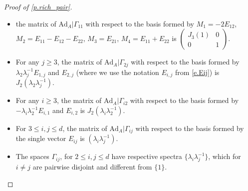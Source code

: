 \documentclass[10pt, a4paper]{amsart}
\theoremstyle{plain}
\theoremstyle{definition}
\theoremstyle{remark}
\theoremstyle{note}
\numberwithin{equation}{section}
\begin{document}
\begin{proof}[Proof of \cref{p.rich_pair}]
\begin{itemize}
\item the matrix of ${{\mathrm{Ad}}_A}{|\Gamma_{11}}$ with respect to the basis formed by 
$M_1 = -2 E_{12}$, $M_2 = E_{11}-E_{12}-E_{22}$, $M_3 = E_{21}$, $M_4 = E_{11}+E_{22}$
is $\begin{pmatrix}J_3(1) & 0 \\ 0 & 1 \end{pmatrix}$.

\item For any $j\geq 3$, the matrix of ${{\mathrm{Ad}}_A}{|\Gamma_{2j}}$ 
with respect to the basis formed by $\lambda_2 \lambda_j^{-1}E_{1,j}$ and $E_{2,j}$
(where we use the notation $E_{i,j}$ from \eqref{e.Eij})
is $J_2(\lambda_2 \lambda_j^{-1})$.

\item For any $i\geq 3$, the matrix of ${{\mathrm{Ad}}_A}{|\Gamma_{i2}}$ 
with respect to the basis formed by $-\lambda_i \lambda_2^{-1}E_{i,1}$ and $E_{i,2}$
is $J_2(\lambda_i \lambda_2^{-1})$.

\item For $3\leq i,j\leq d$, the matrix of ${{\mathrm{Ad}}_A}{|\Gamma_{ij}}$ 
with respect to the basis formed by the single vector $E_{ij}$ is $(\lambda_i\lambda_j^{-1})$.
 
\item The spaces $\Gamma_{ij}$, for $2\leq i,j\leq d$ have  respective spectra $\{\lambda_i\lambda_j^{-1}\}$, which for $i\neq j$ are pairwise disjoint and different from $\{1\}$. 
\end{itemize}


\end{proof}
\end{document}
